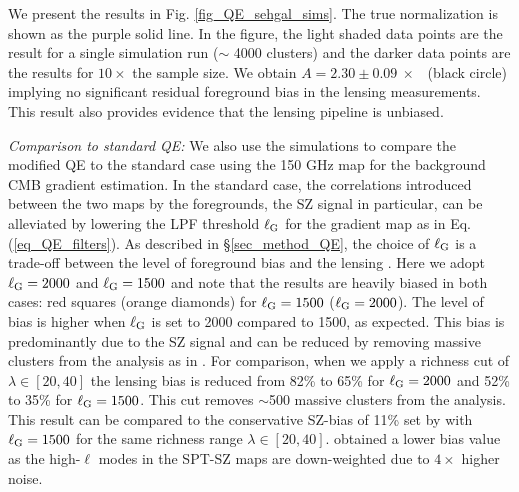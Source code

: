 We present the results in Fig. \ref{fig_QE_sehgal_sims}.
The true normalization is shown as the purple solid line.
In the figure, the light shaded data points are the result for a single simulation run ($\sim$ 4000 clusters) and the darker data points are the results for $10\times$ the sample size. 
We obtain \mbox{$A = 2.30 \pm 0.09\ \times$ \munits} (black circle) implying no significant residual foreground bias in the lensing measurements.
This result also provides evidence that the lensing pipeline is unbiased.

{\it Comparison to standard QE:} We also use the \cite{sehgal10} simulations to compare the modified QE to the standard case using the 150 GHz map for the background CMB gradient estimation.
In the standard case, the correlations introduced between the two maps by the foregrounds, the SZ signal in particular, can be alleviated by lowering the LPF threshold $\ell_{\rm G}$ for the gradient map as in Eq. (\ref{eq_QE_filters}). 
As described in \S\ref{sec_method_QE}, the choice of $\ell_{\rm G}$ is a trade-off between the level of foreground bias and the lensing \snr{}. 
Here we adopt $\ell_{\rm G} = 2000$ and $\ell_{\rm G} = 1500$ and note that the results are heavily biased in both cases: red squares (orange diamonds) for $\ell_{\rm G} = 1500$ ($\ell_{\rm G} = 2000$).
The level of bias is higher when $\ell_{\rm G}$ is set to 2000 compared to 1500, as expected.
This bias is predominantly due to the SZ signal and can be reduced by removing massive clusters from the analysis as in \cite{baxter18}. 
For comparison, when we apply a richness cut of $\lambda \in [20, 40]$ the lensing bias is reduced from 82\% to 65\% for $\ell_{\rm G} = 2000$ and 52\% to 35\% for $\ell_{\rm G} = 1500$. 
This cut removes $\sim$500 massive clusters from the analysis.
This result can be compared to the conservative SZ-bias of 11\% set by \cite{baxter18} with $\ell_{\rm G} = 1500$ for the same richness range $\lambda \in [20, 40]$.
\cite{baxter18} obtained a lower bias value as the high-$\ell$ modes in the SPT-SZ maps are down-weighted due to $4\times$ higher noise.

